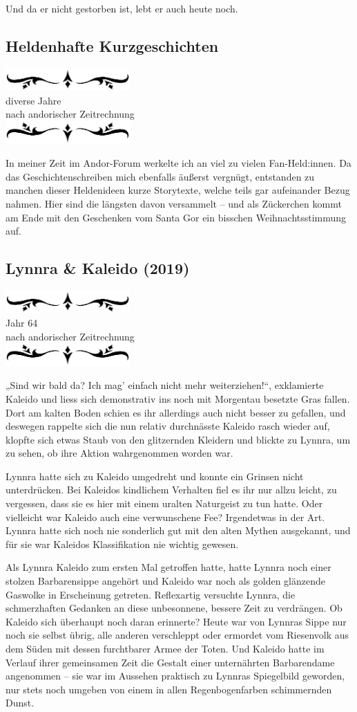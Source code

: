 \documentclass[10pt, a4paper, oneside]{book}
\newcommand{\az}[1]{%
    \begin{center}
        \includegraphics[width=180px]{Das Erbe des Wunderkindes/verzierung1.png}\\
        {\Huge #1} \\
        {nach andorischer Zeitrechnung}\\
        \includegraphics[width=180px]{Das Erbe des Wunderkindes/verzierung2.png}
    \end{center}
    \extramarks{}{#1 a.Z.}
}
\begin{document}
Und da er nicht gestorben ist, lebt er auch heute noch.



\begin{chapterbox}
    \chapter{Heldenhafte Kurzgeschichten}

    \az{diverse Jahre}

    In meiner Zeit im Andor-Forum werkelte ich an viel zu vielen Fan-Held:innen. Da das Geschichtenschreiben mich ebenfalls äußerst vergnügt, entstanden zu manchen dieser Heldenideen kurze Storytexte, welche teils gar aufeinander Bezug nahmen. Hier sind die längsten davon versammelt – und als Zückerchen kommt am Ende mit den Geschenken vom Santa Gor ein bisschen Weihnachtsstimmung auf.
\end{chapterbox}


\section{Lynnra \& Kaleido (2019)}

\az{Jahr 64}

„Sind wir bald da? Ich mag’ einfach nicht mehr weiterziehen!“, exklamierte Kaleido und liess sich demonstrativ ins noch mit Morgentau besetzte Gras fallen. Dort am kalten Boden schien es ihr allerdings auch nicht besser zu gefallen, und deswegen rappelte sich die nun relativ durchnässte Kaleido rasch wieder auf, klopfte sich etwas Staub von den glitzernden Kleidern und blickte zu Lynnra, um zu sehen, ob ihre Aktion wahrgenommen worden war.



Lynnra hatte sich zu Kaleido umgedreht und konnte ein Grinsen nicht unterdrücken. Bei Kaleidos kindlichem Verhalten fiel es ihr nur allzu leicht, zu vergessen, dass sie es hier mit einem uralten Naturgeist zu tun hatte. Oder vielleicht war Kaleido auch eine verwunschene Fee? Irgendetwas in der Art. Lynnra hatte sich noch nie sonderlich gut mit den alten Mythen ausgekannt, und für sie war Kaleidos Klassifikation nie wichtig gewesen.



Als Lynnra Kaleido zum ersten Mal getroffen hatte, hatte Lynnra noch einer stolzen Barbarensippe angehört und Kaleido war noch als golden glänzende Gaswolke in Erscheinung getreten. Reflexartig versuchte Lynnra, die schmerzhaften Gedanken an diese unbesonnene, bessere Zeit zu verdrängen. Ob Kaleido sich überhaupt noch daran erinnerte? Heute war von Lynnras Sippe nur noch sie selbst übrig, alle anderen verschleppt oder ermordet vom Riesenvolk aus dem Süden mit dessen furchtbarer Armee der Toten. Und Kaleido hatte im Verlauf ihrer gemeinsamen Zeit die Gestalt einer unternährten Barbarendame angenommen – sie war im Aussehen praktisch zu Lynnras Spiegelbild geworden, nur stets noch umgeben von einem in allen Regenbogenfarben schimmernden Dunst.
\end{document}
